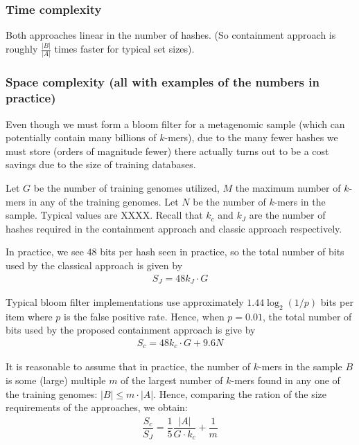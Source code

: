 \documentclass[11pt]{amsart}
\theoremstyle{remark}
\numberwithin{equation}{section}
\begin{document}
\subsubsection{Time complexity}
Both approaches linear in the number of hashes. (So containment approach is roughly $\frac{|B|}{|A|}$ times faster for typical set sizes).
\subsubsection{Space complexity (all with examples of the numbers in practice)}
Even though we must form a bloom filter for a metagenomic sample (which can potentially contain many billions of $k$-mers), due to the many fewer hashes we must store (orders of magnitude fewer) there actually turns out to be a cost savings due to the size of training databases.

Let $G$ be the number of training genomes utilized, $M$ the maximum number of $k$-mers in any of the training genomes. Let $N$ be the number of $k$-mers in the sample. Typical values are XXXX. Recall that $k_c$ and $k_J$ are the number of hashes required in the containment approach and classic approach respectively.

In practice, we see $48$ bits per hash seen in practice, so the total number of bits used by the classical approach is given by
\begin{align*}
S_J = 48k_J\cdot  G
\end{align*}


Typical bloom filter implementations use approximately $1.44\log_2(1/p)$ bits per item where $p$ is the false positive rate. Hence, when $p = 0.01$, the total number of bits used by the proposed containment approach is give by
\begin{align*}
S_c = 48k_c \cdot G + 9.6N
\end{align*}

It is reasonable to assume that in practice, the number of $k$-mers in the sample $B$ is some (large) multiple $m$ of the largest number of $k$-mers found in any one of the training genomes: $|B| \leq m\cdot  |A|$. Hence, comparing the ration of the size requirements of the approaches, we obtain:
\begin{align*}
\dfrac{S_c}{S_J} = \dfrac{1}{5}\dfrac{|A|}{G\cdot  k_c}+\dfrac{1}{m}
\end{align*}
\end{document}
